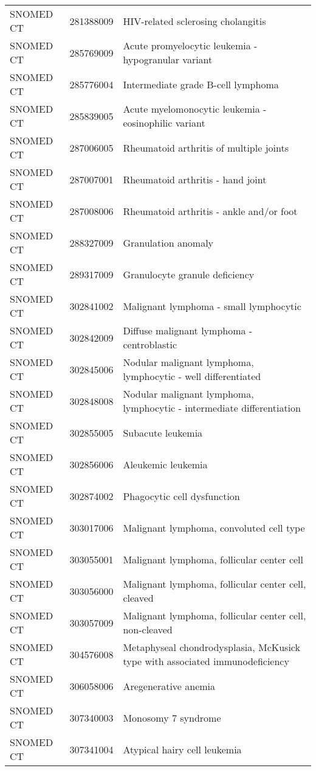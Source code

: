 \begin{table}[ht]
\begin{tabular}{lll}
  SNOMED CT & 281388009 & HIV-related sclerosing cholangitis \\ 
  SNOMED CT & 285769009 & Acute promyelocytic leukemia - hypogranular variant \\ 
  SNOMED CT & 285776004 & Intermediate grade B-cell lymphoma \\ 
  SNOMED CT & 285839005 & Acute myelomonocytic leukemia - eosinophilic variant \\ 
  SNOMED CT & 287006005 & Rheumatoid arthritis of multiple joints \\ 
  SNOMED CT & 287007001 & Rheumatoid arthritis - hand joint \\ 
  SNOMED CT & 287008006 & Rheumatoid arthritis - ankle and/or foot \\ 
  SNOMED CT & 288327009 & Granulation anomaly \\ 
  SNOMED CT & 289317009 & Granulocyte granule deficiency \\ 
  SNOMED CT & 302841002 & Malignant lymphoma - small lymphocytic \\ 
  SNOMED CT & 302842009 & Diffuse malignant lymphoma - centroblastic \\ 
  SNOMED CT & 302845006 & Nodular malignant lymphoma, lymphocytic - well differentiated \\ 
  SNOMED CT & 302848008 & Nodular malignant lymphoma, lymphocytic - intermediate differentiation \\ 
  SNOMED CT & 302855005 & Subacute leukemia \\ 
  SNOMED CT & 302856006 & Aleukemic leukemia \\ 
  SNOMED CT & 302874002 & Phagocytic cell dysfunction \\ 
  SNOMED CT & 303017006 & Malignant lymphoma, convoluted cell type \\ 
  SNOMED CT & 303055001 & Malignant lymphoma, follicular center cell \\ 
  SNOMED CT & 303056000 & Malignant lymphoma, follicular center cell, cleaved \\ 
  SNOMED CT & 303057009 & Malignant lymphoma, follicular center cell, non-cleaved \\ 
  SNOMED CT & 304576008 & Metaphyseal chondrodysplasia, McKusick type with associated immunodeficiency \\ 
  SNOMED CT & 306058006 & Aregenerative anemia \\ 
  SNOMED CT & 307340003 & Monosomy 7 syndrome \\ 
  SNOMED CT & 307341004 & Atypical hairy cell leukemia \\ 

\end{tabular}
\end{table}
